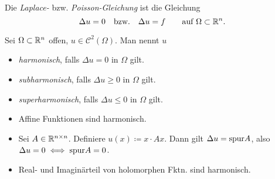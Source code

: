 \documentclass{cheat-sheet}
\DeclareMathOperator{\dive}{div} %
\begin{document}
\begin{defn}
  Die \emph{Laplace-} bzw. \emph{Poisson-Gleichung} ist die Gleichung
  \[ \Delta u = 0 \quad \text{bzw.} \quad \Delta u = f \qquad \text{auf $\Omega \subset \mathbb{R}^n$}. \]
\end{defn}


\iffalse
  Physikalische Motivation/Herleitung

  Beschreibung von Gleichgewichtszuständen von physikalischen Zuständen $u$ (Temperatur / Konzentration)

  Gleichgewicht: "`Nettofluss"' durch den Rand $V \subset \Omega$:
  Jedes (glatt berandete) Testvolumen verschwindet.

  $F \coloneqq Flussdichte von $u

  $0 = \Int{\partial V}{}{F \circ \nu}{S} \overset{\text{Gauss}}{=} \Int{V}{}{\dive F}{x}$

  Es folgt: $\dive F = 0$, da $V$ beliebig

  Typischerweise $F = -a Du$ ($a > 0$).

  Es folgt: $-a \Delta u = 0$

  In der Physik: Diffusion von Feldern, 1. Ficksche Gesetz, Wärmeleitung, Fouriersches Gesetz

  Definition von harmonischen Funktionen und der Fundamentallösung
\fi

\begin{defn}
  Sei $\Omega \subset \mathbb{R}^n$ offen, $u \in \mathcal{C}^2(\Omega)$. Man nennt $u$
  \begin{itemize}
    \item \emph{harmonisch}, falls $\Delta u = 0$ in $\Omega$ gilt.
    \item \emph{subharmonisch}, falls $\Delta u \geq 0$ in $\Omega$ gilt.
    \item \emph{superharmonisch}, falls $\Delta u \leq 0$ in $\Omega$ gilt.
  \end{itemize}
\end{defn}

\begin{bspe}
  \begin{itemize}
    \item Affine Funktionen sind harmonisch.
    \item Sei $A \in \mathbb{R}^{n \times n}$. Definiere $u(x) \coloneqq x \cdot Ax$. Dann gilt $\Delta u = \mathrm{spur} A$, also $\Delta u = 0 \iff \mathrm{spur} A = 0$.
    \item Real- und Imaginärteil von holomorphen Fktn. sind harmonisch.
  \end{itemize}
\end{bspe}
\end{document}
